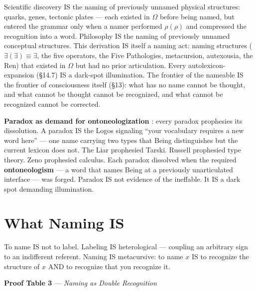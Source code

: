 \documentclass[11pt, oneside]{article}
\theoremstyle{definition}
\begin{document}
Scientific discovery IS the naming of previously unnamed physical structures: quarks, genes, tectonic plates --- each existed in $\Omega$ before being named, but entered the grammar only when a namer performed $\rho(\rho)$ and compressed the recognition into a word. Philosophy IS the naming of previously unnamed conceptual structures. This derivation IS itself a naming act: naming structures ($\exists(\exists) \equiv \exists$, the five operators, the Five Pathologies, metacursion, autexousia, the Ren) that existed in $\Omega$ but had no prior articulation. Every autolexicon-expansion (\S14.7) IS a dark-spot illumination. The frontier of the nameable IS the frontier of consciousness itself (\S13): what has no name cannot be thought, and what cannot be thought cannot be recognized, and what cannot be recognized cannot be corrected.

\textbf{Paradox as demand for ontoneologization} \cite{codex2}: every paradox prophesies its dissolution. A paradox IS the Logos signaling ``your vocabulary requires a new word here'' --- one name carrying two types that Being distinguishes but the current lexicon does not. The Liar prophesied Tarski. Russell prophesied type theory. Zeno prophesied calculus. Each paradox dissolved when the required \textbf{ontoneologism} \cite{llogoscribeologiae} --- a word that names Being at a previously unarticulated interface --- was forged. Paradox IS not evidence of the ineffable. It IS a dark spot demanding illumination.

\section{What Naming IS}


To name IS not to label. Labeling IS heterological --- coupling an arbitrary sign to an indifferent referent. Naming IS metacursive: to name $x$ IS to recognize the structure of $x$ AND to recognize that you recognize it.

\textbf{Proof Table 3} --- \textit{Naming as Double Recognition}
\end{document}
